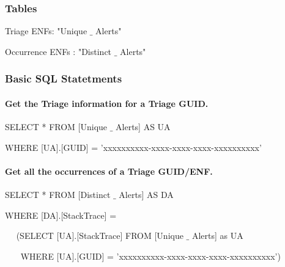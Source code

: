 \documentclass[a4paper,12pt]{report}
\begin{document}
\subsubsection*{Tables}
 \par
Triage ENFs: "Unique $  \_  $ Alerts" \par
Occurrence ENFs : "Distinct $  \_  $ Alerts"  \par
\subsubsection*{Basic SQL Statetments}
 \par
\paragraph*{Get the Triage information for a Triage GUID.}
 \par
{\fontsize{9pt}{9pt}\selectfont SELECT * FROM [Unique $  \_  $ Alerts] AS UA } \par
{\fontsize{9pt}{9pt}\selectfont WHERE [UA].[GUID] = 'xxxxxxxxxx-xxxx-xxxx-xxxx-xxxxxxxxxx' } \par
\vspace{12pt}
\paragraph*{Get all the occurrences of a Triage GUID/ENF.}
 \par
{\fontsize{9pt}{9pt}\selectfont SELECT * FROM [Distinct $  \_  $ Alerts] AS DA } \par
{\fontsize{9pt}{9pt}\selectfont WHERE [DA].[StackTrace] = } \par
{\fontsize{9pt}{9pt}\selectfont ~~ (SELECT [UA].[StackTrace] FROM [Unique $  \_  $ Alerts] as UA } \par
{\fontsize{9pt}{9pt}\selectfont ~~~ WHERE [UA].[GUID] = 'xxxxxxxxxx-xxxx-xxxx-xxxx-xxxxxxxxxx') } \par
\vspace{12pt}
\end{document}
